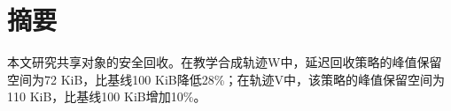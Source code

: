 \chapter*{摘要}
本文研究共享对象的安全回收。在教学合成轨迹W中，延迟回收策略的峰值保留空间为72 KiB，比基线100 KiB降低28\%；在轨迹V中，该策略的峰值保留空间为110 KiB，比基线100 KiB增加10\%。
